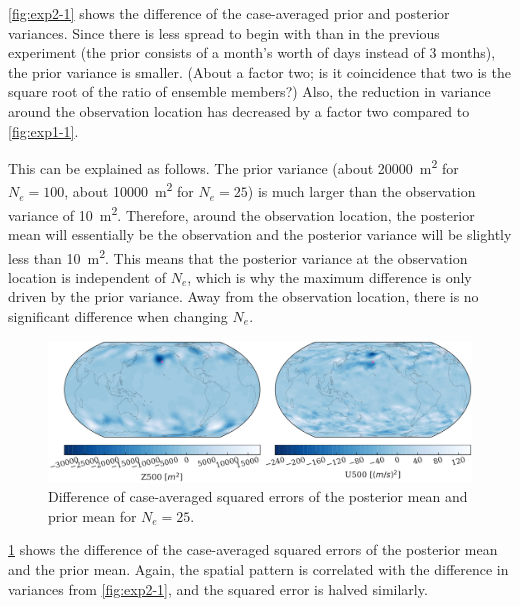 \documentclass[parskip=half,DIV=16]{scrartcl}
\begin{document}
\cref{fig:exp2-1} shows the difference of the case-averaged prior and posterior variances. Since there is less spread to begin with than in the previous experiment (the prior consists of a month's worth of days instead of 3 months), the prior variance is smaller. (About a factor two; is it coincidence that two is the square root of the ratio of ensemble members?) Also, the reduction in variance around the observation location has decreased by a factor two compared to \cref{fig:exp1-1}.

This can be explained as follows. The prior variance (about \qty{20000}{m^2} for $N_e=100$, about \qty{10000}{m^2} for $N_e = 25$) is much larger than the observation variance of \qty{10}{m^2}. Therefore, around the observation location, the posterior mean will essentially be the observation and the posterior variance will be slightly less than \qty{10}{m^2}. This means that the posterior variance at the observation location is independent of $N_e$, which is why the maximum difference is only driven by the prior variance. Away from the observation location, there is no significant difference when changing $N_e$.






\begin{figure}[H]
   \centering
   \includegraphics[width=\textwidth]{figures/exp2_prior_post_se.pdf}
   \caption{Difference of case-averaged squared errors of the posterior mean and prior mean for $N_e = 25$.}
   \label{fig:exp2-3}
\end{figure}

\cref{fig:exp2-3} shows the difference of the case-averaged squared errors of the posterior mean and the prior mean. Again, the spatial pattern is correlated with the difference in variances from \cref{fig:exp2-1}, and the squared error is halved similarly.
\end{document}
